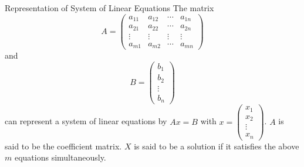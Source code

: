 \documentclass[a4paper]{article}
\begin{document}
\begin{defn}{Representation of System of Linear Equations}{} The matrix $$A=
\begin{pmatrix}
a_{11}&a_{12}&\cdots&a_{1n}\\
a_{21}&a_{22}&\cdots&a_{2n}\\
\vdots&\vdots&\vdots&\vdots\\
a_{m1}&a_{m2}&\cdots&a_{mn}
\end{pmatrix}$$ and $$B=
\begin{pmatrix}
b_1\\
b_2\\
\vdots\\
b_n
\end{pmatrix}$$ can represent a system of linear equations by $Ax=B$ with $x=
\begin{pmatrix}
x_1\\
x_2\\
\vdots\\
x_n
\end{pmatrix}$. $A$ is said to be the coefficient matrix. $X$ is said to be a solution if it satisfies the above $m$ equations simultaneously. 
\end{defn}
\end{document}
